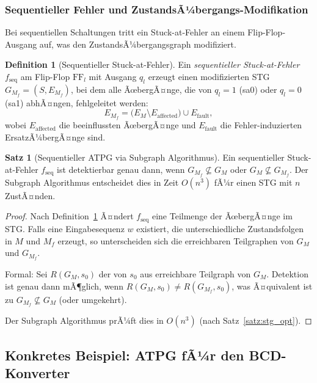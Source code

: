 ﻿\documentclass[a4paper,12pt]{article}
\theoremstyle{definition}
\newtheorem{definition}{Definition}
\newtheorem{satz}{Satz}
\begin{document}
\subsubsection{Sequentieller Fehler und ZustandsÃ¼bergangs-Modifikation}

Bei sequentiellen Schaltungen tritt ein Stuck-at-Fehler an einem Flip-Flop-Ausgang auf,
was den ZustandsÃ¼bergangsgraph modifiziert.

\begin{definition}[Sequentieller Stuck-at-Fehler]\label{def:seqstuckat}
  Ein \emph{sequentieller Stuck-at-Fehler} $f_{\text{seq}}$ am Flip-Flop $\text{FF}_l$
  mit Ausgang $q_l$ erzeugt einen modifizierten STG $G_{M_f} = (S, E_{M_f})$, bei dem
  alle ÃœbergÃ¤nge, die von $q_l = 1$ (sa0) oder $q_l = 0$ (sa1) abhÃ¤ngen, fehlgeleitet
  werden:
  \[
    E_{M_f} = \bigl(E_M \setminus E_{\text{affected}}\bigr) \cup E_{\text{fault}},
  \]
  wobei $E_{\text{affected}}$ die beeinflussten ÃœbergÃ¤nge und $E_{\text{fault}}$ die
  Fehler-induzierten ErsatzÃ¼bergÃ¤nge sind.
\end{definition}

\begin{satz}[Sequentieller ATPG via Subgraph Algorithmus]\label{satz:seqatpg}
  Ein sequentieller Stuck-at-Fehler $f_{\text{seq}}$ ist detektierbar genau dann,
  wenn $G_{M_f} \not\subseteq G_M$ oder $G_M \not\subseteq G_{M_f}$. Der Subgraph
  Algorithmus entscheidet dies in Zeit $O(n^3)$ fÃ¼r einen STG mit $n$ ZustÃ¤nden.
\end{satz}

\begin{proof}
  Nach Definition~\ref{def:seqstuckat} Ã¤ndert $f_{\text{seq}}$ eine Teilmenge der
  ÃœbergÃ¤nge im STG. Falls eine Eingabesequenz $w$ existiert, die unterschiedliche
  Zustandsfolgen in $M$ und $M_f$ erzeugt, so unterscheiden sich die erreichbaren
  Teilgraphen von $G_M$ und $G_{M_f}$.

  Formal: Sei $R(G_M, s_0)$ der von $s_0$ aus erreichbare Teilgraph von $G_M$.
  Detektion ist genau dann mÃ¶glich, wenn $R(G_M, s_0) \neq R(G_{M_f}, s_0)$, was
  Ã¤quivalent ist zu $G_{M_f} \not\subseteq G_M$ (oder umgekehrt).

  Der Subgraph Algorithmus prÃ¼ft dies in $O(n^3)$ (nach Satz~\ref{satz:stg_opt}).
\end{proof}

\subsection{Konkretes Beispiel: ATPG fÃ¼r den BCD-Konverter}
\end{document}
